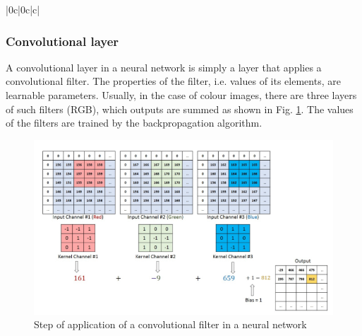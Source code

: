 \begin{table}[h]
\begin{center}
\begin{tabular}{ |0c|0c|c|}
\hline
\end{tabular}
\caption[convo]{Examplary convolutional kernels applied on an image\footnotemark. }
  \label{tab:classical_kernel}
\end{center}
\end{table}




\subsubsection{Convolutional layer}

A convolutional layer in a neural network is simply a layer that applies a convolutional filter. The properties of the filter, i.e. values of its elements, are learnable parameters.
Usually, in the case of colour images, there are three layers of such filters (RGB), which outputs are summed as shown in Fig. \ref{fig:conv_layer}.
The values of the filters are trained by the backpropagation algorithm.

\begin{figure}
  \centering
  \includegraphics[width=0.9\linewidth]{figures/chapter3/convo_steps.png}
  \caption{Step of application of a convolutional filter in a neural network \protect\footnotemark}
  \label{fig:conv_layer}
\end{figure}


